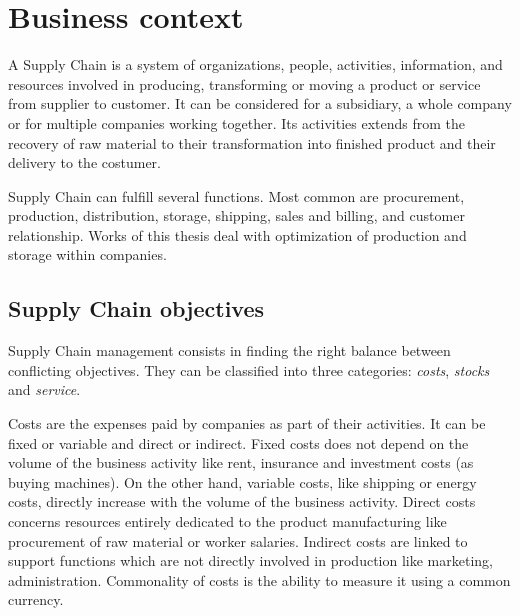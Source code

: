 \chapter{Business context}
\label{chap:business-context}


A Supply Chain is a system of organizations, people, activities, information, and resources involved in producing, transforming or moving a product or service from supplier to customer.
It can be considered for a subsidiary, a whole company or for multiple companies working together.
Its activities extends from the recovery of raw material to their transformation into finished product and their delivery to the costumer.


Supply Chain can fulfill several functions.
Most common are procurement, production, distribution, storage, shipping, sales and billing, and customer relationship.
Works of this thesis deal with optimization of production and storage within companies.


\section{Supply Chain objectives}
\label{sec:business-context:supply-chain-objectives}


Supply Chain management consists in finding the right balance between conflicting objectives.
They can be classified into three categories: \emph{costs}, \emph{stocks} and \emph{service}.


Costs are the expenses paid by companies as part of their activities.
It can be fixed or variable and direct or indirect.
Fixed costs does not depend on the volume of the business activity like rent, insurance and investment costs (as buying machines).
On the other hand, variable costs, like shipping or energy costs, directly increase with the volume of the business activity.
Direct costs concerns resources entirely dedicated to the product manufacturing like procurement of raw material or worker salaries.
Indirect costs are linked to support functions which are not directly involved in production like marketing, administration.
Commonality of costs is the ability to measure it using a common currency.


